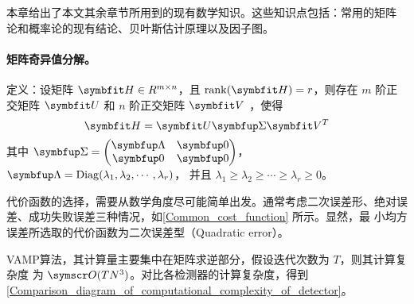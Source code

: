 \documentclass[type=master]{../gdutthesis}
\newcommand{\mbfit}{\symbfit}
\newcommand{\mbf}{\symbfup}
\newcommand{\mscr}{\symscr}
\DeclareMathOperator*{\Diag}{Diag}
\begin{document}

本章给出了本文其余章节所用到的现有数学知识。这些知识点包括：常用的矩阵
论和概率论的现有结论、贝叶斯估计原理以及因子图。


\paragraph{矩阵奇异值分解。}

定义：设矩阵 $\mbfit H \in R^{m \times n}$，且 $\rank(\mbfit H) = r$，则存在
$m$ 阶正交矩阵 $\mbfit U$ 和 $n$ 阶正交矩阵 $\mbfit V$ ，使得
\begin{equation}
  \mbfit H = \mbfit U \mbf \Sigma \mbfit V^T
\end{equation}
其中 $\mbf \Sigma = \begin{pmatrix}
  \mbf \Lambda & \mbf 0 \\
  \mbf 0       & \mbf 0
\end{pmatrix}$，
$\mbf \Lambda = \Diag ( \lambda_1, \lambda_2, \cdots, \lambda_r )$，
并且 $\lambda_1 \geqslant \lambda_2 \geqslant \cdots \geqslant \lambda_r \geqslant 0$。


代价函数的选择，需要从数学角度尽可能简单出发。通常考虑二次误差形、绝对误
差、成功失败误差三种情况，如\autoref{Common_cost_function} 所示。显然，最
小均方误差所选取的代价函数为二次误差型（Quadratic error）。

\begin{figure}[htbp]
  \quad
  \quad
  \label{Common_cost_function}
\end{figure}


VAMP算法，其计算量主要集中在矩阵求逆部分，假设迭代次数为 $T$，则其计算复杂度
为 $\mscr O(TN^3)$。对比各检测器的计算复杂度，得到\autoref{Comparison_diagram_of_computational_complexity_of_detector}。
\end{document}
